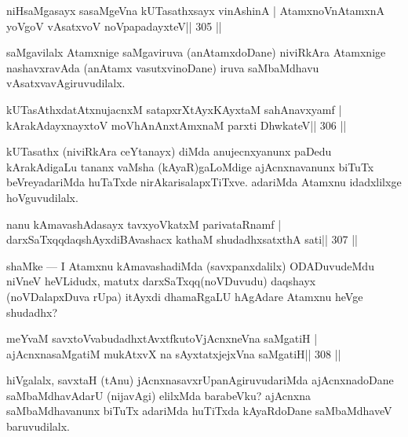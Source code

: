 \begin{shl}
niHsaMgasayx sasaMgeVna kUTasathxsayx vinAshinA |
AtamxnoV\s nAtamxnA yoVgoV vAsatxvoV noVpapadayxteV\hfill || 305 ||
\end{shl}

\begin{artha}
saMgavilalx Atamxnige saMgaviruva (anAtamxdoDane) niviRkAra Atamxnige nashavxravAda (anAtamx vasutxvinoDane) iruva saMbaMdhavu vAsatxvavAgiruvudilalx.
\end{artha}


\begin{shl}
kUTasAthxdatAtxnujacnxM satapxrXtAyxKAyxtaM sahAnavxyamf |
kArakAdayxnayxtoV moVhAnAnx\s\s tAmxnaM parxti DhwkateV\hfill || 306 ||
\end{shl}

\begin{artha}
kUTasathx (niviRkAra ceYtanayx) diMda anujecnxyanunx paDedu 
kArakAdigaLu tananx vaMsha (kAyaR)gaLoMdige ajAcnxnavanunx biTuTx beVreyadariMda huTaTxde nirAkarisalapxTiTxve. adariMda Atamxnu idadxlilxge hoVguvudilalx.
\end{artha}

\begin{shl}
nanu kAmavashAdasayx tavxyoVkatxM parivataRnamf |
darxSaTxqqdaqshAyxdiBAvashacx kathaM shudadhxsatxthA sati\hfill || 307 ||
\end{shl}

\begin{artha}
shaMke  {\rm ---}  I Atamxnu kAmavashadiMda (savxpanxdalilx) ODADuvudeMdu 
niVneV heVLidudx, matutx darxSaTxqq(noVDuvudu) daqshayx (noVDalapxDuva rUpa) itAyxdi dhamaRgaLU hAgAdare Atamxnu heVge shudadhx?
\end{artha}


\begin{shl}
meYvaM savxtoV\s vabudadhxtAvxtfkutoV\s jAcnxneVna saMgatiH |
ajAcnxnasaMgatiM mukAtxvX na sAyxtatxjejxVna saMgatiH\hfill || 308 ||
\end{shl}

\begin{artha}
hiVgalalx, savxtaH (tAnu) jAcnxnasavxrUpanAgiruvudariMda ajAcnxnadoDane saMbaMdhavAdarU (nijavAgi) elilxMda barabeVku? ajAcnxna saMbaMdhavanunx biTuTx adariMda huTiTxda kAyaRdoDane saMbaMdhaveV baruvudilalx.
\end{artha}

